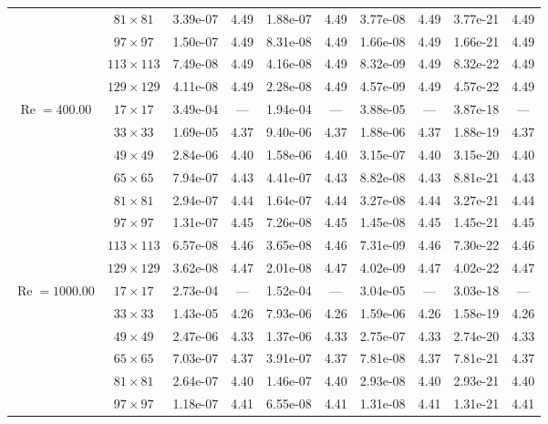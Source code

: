 \documentclass[preprint, 12pt]{elsarticle}
\begin{document}
{\begin{center}
\begin{table}[H]
{\begin{tabular*}{\textwidth}{@{\extracolsep\fill}cccccccccc@{}}
    & $81\times 81$ & 3.39e-07 & 4.49 & 1.88e-07 & 4.49 & 3.77e-08 & 4.49 & 3.77e-21 & 4.49 \\
    & $97\times 97$ & 1.50e-07 & 4.49 & 8.31e-08 & 4.49 & 1.66e-08 & 4.49 & 1.66e-21 & 4.49 \\
    & $113\times 113$ & 7.49e-08 & 4.49 & 4.16e-08 & 4.49 & 8.32e-09 & 4.49 & 8.32e-22 & 4.49 \\
    & $129\times 129$ & 4.11e-08 & 4.49 & 2.28e-08 & 4.49 & 4.57e-09 & 4.49 & 4.57e-22 & 4.49 \\
    \hline
    \multirow{7}{*}{$\operatorname{Re}=400.00$} & $17\times 17$ & 3.49e-04 & --- & 1.94e-04 & --- & 3.88e-05 & --- & 3.87e-18 & --- \\
    & $33\times 33$ & 1.69e-05 & 4.37 & 9.40e-06 & 4.37 & 1.88e-06 & 4.37 & 1.88e-19 & 4.37 \\
    & $49\times 49$ & 2.84e-06 & 4.40 & 1.58e-06 & 4.40 & 3.15e-07 & 4.40 & 3.15e-20 & 4.40 \\
    \multirow{3}{*}{$\operatorname{Wi}=5$} & $65\times 65$ & 7.94e-07 & 4.43 & 4.41e-07 & 4.43 & 8.82e-08 & 4.43 & 8.81e-21 & 4.43 \\
    & $81\times 81$ & 2.94e-07 & 4.44 & 1.64e-07 & 4.44 & 3.27e-08 & 4.44 & 3.27e-21 & 4.44 \\
    & $97\times 97$ & 1.31e-07 & 4.45 & 7.26e-08 & 4.45 & 1.45e-08 & 4.45 & 1.45e-21 & 4.45 \\
    & $113\times 113$ & 6.57e-08 & 4.46 & 3.65e-08 & 4.46 & 7.31e-09 & 4.46 & 7.30e-22 & 4.46 \\
    & $129\times 129$ & 3.62e-08 & 4.47 & 2.01e-08 & 4.47 & 4.02e-09 & 4.47 & 4.02e-22 & 4.47 \\
    \hline
    \multirow{7}{*}{$\operatorname{Re}=1000.00$} & $17\times 17$ & 2.73e-04 & --- & 1.52e-04 & --- & 3.04e-05 & --- & 3.03e-18 & --- \\
    & $33\times 33$ & 1.43e-05 & 4.26 & 7.93e-06 & 4.26 & 1.59e-06 & 4.26 & 1.58e-19 & 4.26 \\
    & $49\times 49$ & 2.47e-06 & 4.33 & 1.37e-06 & 4.33 & 2.75e-07 & 4.33 & 2.74e-20 & 4.33 \\
    \multirow{3}{*}{$\operatorname{Wi}=5$} & $65\times 65$ & 7.03e-07 & 4.37 & 3.91e-07 & 4.37 & 7.81e-08 & 4.37 & 7.81e-21 & 4.37 \\
    & $81\times 81$ & 2.64e-07 & 4.40 & 1.46e-07 & 4.40 & 2.93e-08 & 4.40 & 2.93e-21 & 4.40 \\
    & $97\times 97$ & 1.18e-07 & 4.41 & 6.55e-08 & 4.41 & 1.31e-08 & 4.41 & 1.31e-21 & 4.41 \\

\end{tabular*}}
\end{table}
\end{center}}
\end{document}

